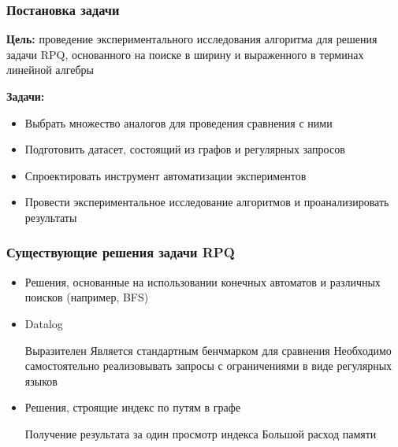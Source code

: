 \documentclass{beamer}
\begin{document}
\begin{frame}
  \frametitle{Постановка задачи}
  \textbf{Цель:} проведение экспериментального исследования алгоритма для решения задачи RPQ, основанного на поиске в ширину и выраженного в терминах линейной алгебры

  \textbf{Задачи:}
  \begin{itemize}
    \item Выбрать множество аналогов для проведения сравнения с ними
    \item Подготовить датасет, состоящий из графов и регулярных запросов
    \item Спроектировать инструмент автоматизации экспериментов
    \item Провести экспериментальное исследование алгоритмов и проанализировать результаты
  \end{itemize}
\end{frame}

\begin{frame}[fragile]
  \frametitle{Существующие решения задачи RPQ}
  \noindent\begin{minipage}{1\textwidth}
    \begin{itemize}
      \item Решения, основанные на использовании конечных автоматов и различных поисков (например, BFS)
      \item Datalog
            \begin{itemize}
              \pro Выразителен
              \pro Является стандартным бенчмарком для сравнения
              \con Необходимо самостоятельно реализовывать запросы с ограничениями в виде регулярных языков
            \end{itemize}
      \item Решения, строящие индекс по путям в графе
            \begin{itemize}
              \pro Получение результата за один просмотр индекса
              \con Большой расход памяти
            \end{itemize}
    \end{itemize}
  \end{minipage}
\end{frame}
\end{document}
